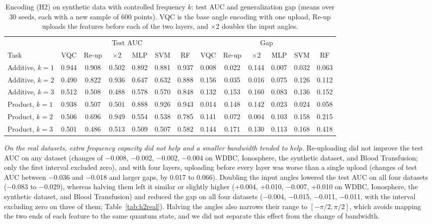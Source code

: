 \begin{table}[t]
\centering
\caption{Encoding (H2) on synthetic data with controlled frequency $k$: test AUC and generalization gap (means over 30 seeds, each with a new sample of 600 points). VQC is the base angle encoding with one upload, Re-up uploads the features before each of the two layers, and $\times$2 doubles the input angles.}
\label{tab:h2synth}
\footnotesize
\setlength{\tabcolsep}{3.5pt}
\begin{tabular}{lcccccccccccc}
\hline
 & \multicolumn{6}{c}{Test AUC} & \multicolumn{6}{c}{Gap} \\
Task & VQC & Re-up & $\times$2 & MLP & SVM & RF & VQC & Re-up & $\times$2 & MLP & SVM & RF \\
\hline
Additive, $k=1$ & 0.944 & 0.908 & 0.502 & 0.892 & 0.881 & 0.937 & 0.008 & 0.022 & 0.144 & 0.007 & 0.032 & 0.063 \\
Additive, $k=2$ & 0.490 & 0.822 & 0.936 & 0.647 & 0.632 & 0.888 & 0.156 & 0.035 & 0.016 & 0.075 & 0.126 & 0.112 \\
Additive, $k=3$ & 0.512 & 0.508 & 0.488 & 0.578 & 0.570 & 0.848 & 0.132 & 0.153 & 0.160 & 0.083 & 0.136 & 0.152 \\
\hline
Product, $k=1$ & 0.938 & 0.507 & 0.501 & 0.888 & 0.926 & 0.943 & 0.014 & 0.148 & 0.142 & 0.023 & 0.024 & 0.058 \\
Product, $k=2$ & 0.506 & 0.696 & 0.949 & 0.554 & 0.538 & 0.785 & 0.141 & 0.072 & 0.004 & 0.103 & 0.158 & 0.215 \\
Product, $k=3$ & 0.501 & 0.486 & 0.513 & 0.509 & 0.507 & 0.582 & 0.144 & 0.171 & 0.130 & 0.113 & 0.168 & 0.418 \\
\hline
\end{tabular}
\end{table}

\textit{On the real datasets, extra frequency capacity did not help and a smaller bandwidth tended to help.} Re-uploading did not improve the test AUC on any dataset (changes of $-$0.008, $-$0.002, $-$0.002, $-$0.004 on WDBC, Ionosphere, the synthetic dataset, and Blood Transfusion; only the first interval excluded zero), and with four layers, uploading before every layer was worse than a single upload (changes of test AUC between $-$0.036 and $-$0.018 and larger gaps, by 0.017 to 0.066). Doubling the input angles lowered the test AUC on all four datasets ($-$0.083 to $-$0.029), whereas halving them left it similar or slightly higher ($+$0.004, $+$0.010, $-$0.007, $+$0.010 on WDBC, Ionosphere, the synthetic dataset, and Blood Transfusion) and reduced the gap on all four datasets ($-$0.004, $-$0.015, $-$0.011, $-$0.011, with the interval excluding zero on three of them; Table~\ref{tab:h2real}). Halving the angles also narrows their range to $[-\pi/2,\pi/2]$, which avoids mapping the two ends of each feature to the same quantum state, and we did not separate this effect from the change of bandwidth.

